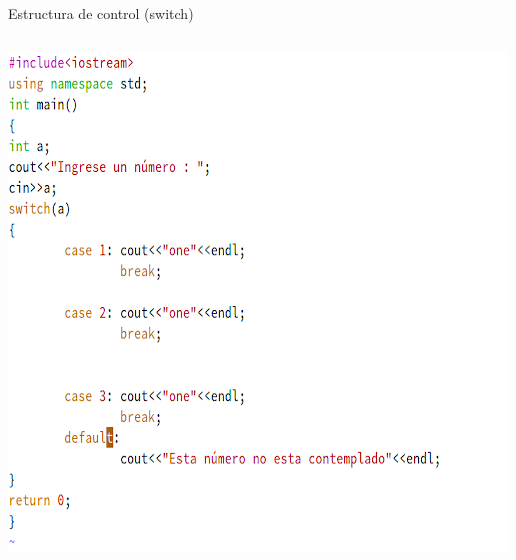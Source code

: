\documentclass[presentation, aspectratio=54]{beamer}
\begin{document}
\begin{frame}[label={sec:org154be20}]{Estructura de control (switch)}
\begin{columns}
\begin{column}{0.6\columnwidth}
\begin{center}
\includegraphics[width=.9\linewidth]{./images/codigo/code-switch.png}
\end{center}
\end{column}
\end{columns}
\end{frame}
\end{document}

